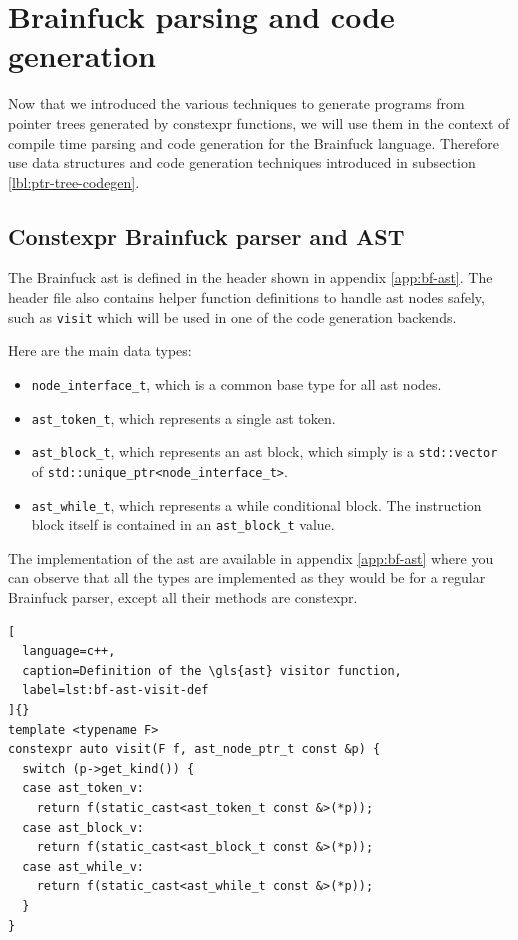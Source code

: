 \documentclass[../main]{subfiles}
\begin{document}
\section{
  Brainfuck parsing and code generation
}
\label{lbl:bf-parsing-and-codegen}

Now that we introduced the various techniques to generate programs from
pointer trees generated by \gls{constexpr} functions, we will use them in the
context of compile time parsing and code generation for the Brainfuck language.
Therefore use data structures and code generation techniques introduced in
subsection \ref{lbl:ptr-tree-codegen}.

\subsection{
  Constexpr Brainfuck parser and AST
}

The Brainfuck \gls{ast} is defined in the header shown in appendix
\ref{app:bf-ast}. The header file also contains helper function definitions
to handle \gls{ast} nodes safely, such as \lstinline{visit} which will be used
in one of the code generation backends.

Here are the main data types:

\begin{itemize}
\item
\lstinline{node_interface_t}, which is a common base type for all \gls{ast} nodes.

\item
\lstinline{ast_token_t}, which represents a single \gls{ast} token.

\item
\lstinline{ast_block_t}, which represents an \gls{ast} block, which simply is a
\lstinline{std::vector} of \lstinline{std::unique_ptr<node_interface_t>}.

\item
\lstinline{ast_while_t}, which represents a while conditional block.
The instruction block itself is contained in an \lstinline{ast_block_t} value.

\end{itemize}

The implementation of the \gls{ast} are available in appendix \ref{app:bf-ast}
where you can observe that all the types are implemented as they would be
for a regular Brainfuck parser, except all their methods are \gls{constexpr}.

\begin{lstlisting}[
  language=c++,
  caption=Definition of the \gls{ast} visitor function,
  label=lst:bf-ast-visit-def
]{}
template <typename F>
constexpr auto visit(F f, ast_node_ptr_t const &p) {
  switch (p->get_kind()) {
  case ast_token_v:
    return f(static_cast<ast_token_t const &>(*p));
  case ast_block_v:
    return f(static_cast<ast_block_t const &>(*p));
  case ast_while_v:
    return f(static_cast<ast_while_t const &>(*p));
  }
}
\end{lstlisting}
\end{document}
